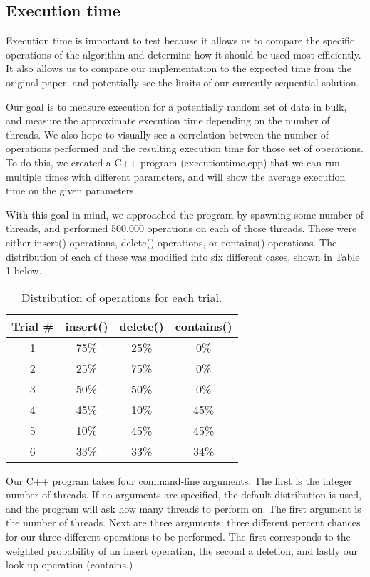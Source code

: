\documentclass[journal]{IEEEtran}
\begin{document}
\subsection{Execution time}

Execution time is important to test because it allows us to compare the specific operations of the algorithm and determine how it should be used most efficiently. It also allows us to compare our implementation to the expected time from the original paper, and potentially see the limits of our currently sequential solution.

Our goal is to measure execution for a potentially random set of data in bulk, and measure the approximate execution time depending on the number of threads. We also hope to visually see a correlation between the number of operations performed and the resulting execution time for those set of operations. To do this, we created a C++ program (executiontime.cpp) that we can run multiple times with different parameters, and will show the average execution time on the given parameters.

With this goal in mind, we approached the program by spawning some number of threads, and performed 500,000 operations on each of those threads. These were either insert() operations, delete() operations, or contains() operations. The distribution of each of these was modified into six different cases, shown in Table 1 below.

\begin{table}[h]
\centering
\begin{center}
\begin{tabular}{ |c|c|c|c| } 
 \hline
 Trial \# & insert() & delete() & contains() \\ 
 \hline
 1 & 75\% & 25\% & 0\% \\ 
 2 & 25\% & 75\% & 0\% \\ 
 3 & 50\% & 50\% & 0\% \\ 
 4 & 45\% & 10\% & 45\% \\ 
 5 & 10\% & 45\% & 45\% \\ 
 6 & 33\% & 33\% & 34\% \\ 
 \hline
\end{tabular}
\end{center}
\caption{Distribution of operations for each trial.}
\end{table}


Our C++ program takes four command-line arguments. The first is the integer number of threads. If no arguments are specified, the default distribution is used, and the program will ask how many threads to perform on. The first argument is the number of threads. Next are three arguments: three different percent chances for our three different operations to be performed. The first corresponds to the weighted probability of an insert operation, the second a deletion, and lastly our look-up operation (contains.)
\end{document}
